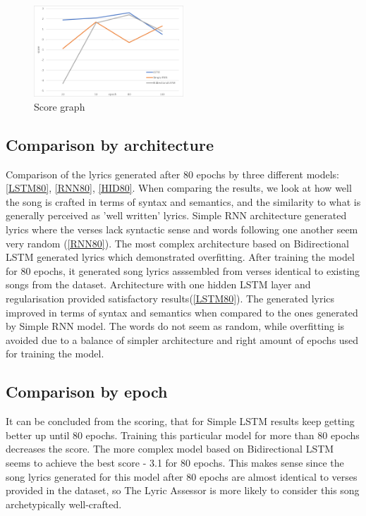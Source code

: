 \documentclass[conference]{IEEEtran}
\begin{document}
\begin{figure}[htbp]
\centerline{\includegraphics[width=0.5\textwidth]{scoregraph.png}}
\caption{Score graph}
\label{scoregraph}
\end{figure}

\subsection{Comparison by architecture}
Comparison of the lyrics generated after 80 epochs by three different models:
\ref{LSTM80}, \ref{RNN80}, \ref{HID80}.
When comparing the results, we look at how well the song is crafted in terms of syntax and semantics, and the similarity to what is generally perceived as 'well written' lyrics. 
Simple RNN architecture generated lyrics where the verses lack syntactic sense and words following one another seem very random (\ref{RNN80}). 
The most complex architecture based on Bidirectional LSTM generated lyrics which demonstrated overfitting. After training the model for 80 epochs, it generated song lyrics asssembled from verses identical to existing songs from the dataset.
Architecture with one hidden LSTM layer and regularisation provided satisfactory results(\ref{LSTM80}). The generated lyrics improved in terms of syntax and semantics when compared to the ones generated by Simple RNN model. The words do not seem as random, while overfitting is avoided due to a balance of simpler architecture and right amount of epochs used for training the model.

\subsection{Comparison by epoch}
It can be concluded from the scoring, 
that for Simple LSTM results keep getting better up until 80 epochs. Training this particular model for more than 80 epochs decreases the score.
The more complex model based on Bidirectional LSTM seems to achieve the best score - 3.1 for 80 epochs. This makes sense since the song lyrics 
generated for this model after 80 epochs are almost identical to verses provided in the dataset, so The Lyric Assessor is more likely to consider 
this song archetypically well-crafted.
\end{document}
